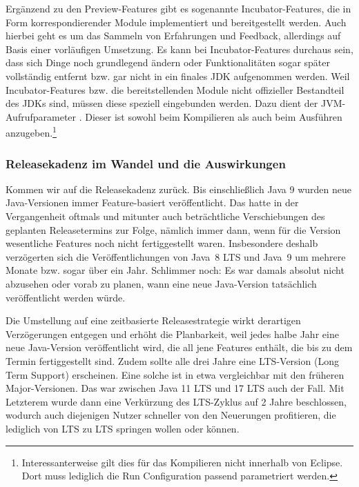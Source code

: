 Ergänzend zu den Preview-Features  gibt es  sogenannte Incubator-Features,
die in Form korrespondierender Module implementiert und bereitgestellt werden.
Auch hierbei geht es um das Sammeln von Erfahrungen und Feedback, allerdings
auf Basis einer  vorläufigen Umsetzung.
Es kann bei Incubator-Features durchaus sein, dass sich Dinge noch grundlegend ändern
oder Funktionalitäten sogar später vollständig entfernt
bzw. gar nicht in ein finales JDK aufgenommen werden. Weil Incubator-Features bzw.
die bereitstellenden Module nicht offizieller Bestandteil des JDKs sind, müssen diese speziell
eingebunden werden. Dazu dient der JVM-Aufrufparameter \code{-}.
Dieser ist sowohl beim Kompilieren als auch beim Ausführen anzugeben.\footnote{Interessanterweise
gilt dies für das Kompilieren nicht innerhalb von Eclipse. Dort muss
lediglich die Run Configuration passend parametriert werden.}






\subsubsection{Releasekadenz im Wandel und die Auswirkungen}


Kommen wir auf die Releasekadenz zurück.
Bis einschließlich Java 9 wurden neue Java-Versionen immer Feature-basiert
veröffentlicht.
Das hatte in der Vergangenheit oftmals und mitunter auch beträchtliche  Verschiebungen des
geplanten Releasetermins zur Folge, nämlich immer dann, wenn  für die Version wesentliche Features noch
nicht fertiggestellt waren. Insbesondere deshalb verzögerten sich die Veröffentlichungen von
Java~8 LTS und Java~9 um mehrere Monate bzw. sogar über ein Jahr.
 Schlimmer noch: Es war damals absolut nicht abzusehen
oder vorab zu planen, wann eine neue Java-Version tatsächlich veröffentlicht werden würde.

Die Umstellung auf eine zeitbasierte Releasestrategie
wirkt derartigen Verzögerungen entgegen und erhöht die Planbarkeit, weil jedes halbe Jahr
eine neue Java-Version veröffentlicht wird, die all jene Features enthält, die bis zu
dem Termin fertiggestellt sind.
Zudem sollte alle drei Jahre eine LTS-Version (Long Term Support) erscheinen. Eine
solche ist in etwa vergleichbar mit den früheren Major-Versionen. Das war zwischen Java 11 LTS
und 17 LTS  auch der Fall. Mit Letzterem wurde dann eine Verkürzung des
LTS-Zyklus auf 2 Jahre beschlossen, wodurch auch diejenigen Nutzer schneller von den
Neuerungen profitieren, die lediglich von LTS zu LTS springen wollen oder können.

